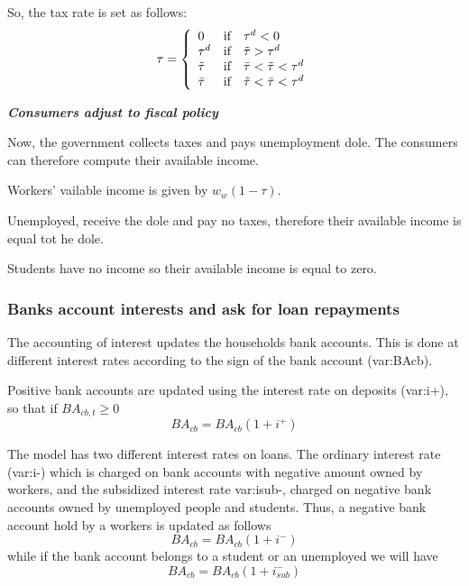 \documentclass{book}
\begin{document}
So, the tax rate is set as follows:
\[
	\tau=\left\{ 
		\begin{array}{l l l}
			0& \textnormal{if} &\tau^d<0\\ 
			\tau^d& \textnormal{if} &\tilde{\tau}>\tau^d \\ 
			\tilde{\tau}& \textnormal{if} &\bar{\tau}<\tilde{\tau}<\tau^d\\ 
			\bar{\tau}& \textnormal{if} &\tilde{\tau}<\bar{\tau}<\tau^d\\ 
		\end{array}
		\right.
\]


\vskip5mm
\textit{\textbf{Consumers adjust to fiscal policy}}

Now, the government collects taxes and pays unemployment dole. The consumers can therefore compute their available income.

Workers' vailable income is given by $w_w(1-\tau)$.

Unemployed, receive the dole and pay no taxes, therefore their available income is equal tot he dole.

Students have no income so their available income is equal to zero.

\subsubsection{Banks account interests and ask for loan repayments}

The accounting of interest updates the households bank accounts. This is done at different interest rates according to the sign of the bank account (\gls{var:BAcb}).

Positive bank accounts are updated using the interest rate on deposits (\gls{var:i+}), so that if $BA_{cb,t}\ge 0$
\[
BA_{cb}=BA_{cb}(1+i^+)
\]

The model has two different interest rates on loans. The ordinary interest rate (\gls{var:i-}) which is charged on bank accounts with negative amount owned by workers, and the subsidized interest rate \gls{var:isub-}, charged on negative bank accounts owned by unemployed people and students. Thus, a negative bank account hold by a workers is updated as follows 
\[
BA_{cb}=BA_{cb}(1+i^-)
\]
while if the bank account belongs to a student or an unemployed we will have 
\[
	BA_{cb}=BA_{cb}(1+i^-_{sub})
\]
\end{document}
